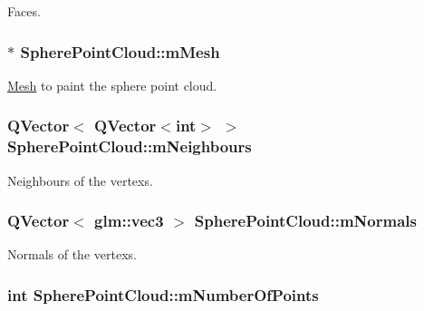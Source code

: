 Faces. 

\hypertarget{class_sphere_point_cloud_a722ae327d20905a422c279bc0bc60258}{
\subsubsection[{m\+Mesh}]{$\ast$ Sphere\+Point\+Cloud\+::m\+Mesh\hspace{0.3cm}{\ttfamily [protected]}}}\label{class_sphere_point_cloud_a722ae327d20905a422c279bc0bc60258}


\hyperlink{class_mesh}{Mesh} to paint the sphere point cloud. 

\hypertarget{class_sphere_point_cloud_a11b1736edb303b804dc0882edc8718a8}{
\subsubsection[{m\+Neighbours}]{\setlength{\rightskip}{0pt plus 5cm}Q\+Vector$<$ Q\+Vector$<$int$>$ $>$ Sphere\+Point\+Cloud\+::m\+Neighbours\hspace{0.3cm}{\ttfamily [protected]}}}\label{class_sphere_point_cloud_a11b1736edb303b804dc0882edc8718a8}


Neighbours of the vertexs. 

\hypertarget{class_sphere_point_cloud_a01a10f53b2432af26235a1acc98391eb}{
\subsubsection[{m\+Normals}]{\setlength{\rightskip}{0pt plus 5cm}Q\+Vector$<$ glm\+::vec3 $>$ Sphere\+Point\+Cloud\+::m\+Normals\hspace{0.3cm}{\ttfamily [protected]}}}\label{class_sphere_point_cloud_a01a10f53b2432af26235a1acc98391eb}


Normals of the vertexs. 

\hypertarget{class_sphere_point_cloud_a0579096387a36228a7167de55d131292}{
\subsubsection[{m\+Number\+Of\+Points}]{\setlength{\rightskip}{0pt plus 5cm}int Sphere\+Point\+Cloud\+::m\+Number\+Of\+Points\hspace{0.3cm}{\ttfamily [protected]}}}\label{class_sphere_point_cloud_a0579096387a36228a7167de55d131292}


